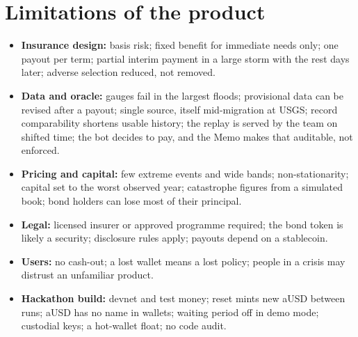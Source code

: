 \documentclass[11pt]{article}
\begin{document}
\section{Limitations of the product}
\begin{itemize}
\item \textbf{Insurance design:} basis risk; fixed benefit for immediate needs only; one payout per term; partial interim payment in a large storm with the rest days later; adverse selection reduced, not removed.
\item \textbf{Data and oracle:} gauges fail in the largest floods; provisional data can be revised after a payout; single source, itself mid-migration at USGS; record comparability shortens usable history; the replay is served by the team on shifted time; the bot decides to pay, and the Memo makes that auditable, not enforced.
\item \textbf{Pricing and capital:} few extreme events and wide bands; non-stationarity; capital set to the worst observed year; catastrophe figures from a simulated book; bond holders can lose most of their principal.
\item \textbf{Legal:} licensed insurer or approved programme required; the bond token is likely a security; disclosure rules apply; payouts depend on a stablecoin.
\item \textbf{Users:} no cash-out; a lost wallet means a lost policy; people in a crisis may distrust an unfamiliar product.
\item \textbf{Hackathon build:} devnet and test money; reset mints new aUSD between runs; aUSD has no name in wallets; waiting period off in demo mode; custodial keys; a hot-wallet float; no code audit.
\end{itemize}

\end{document}
